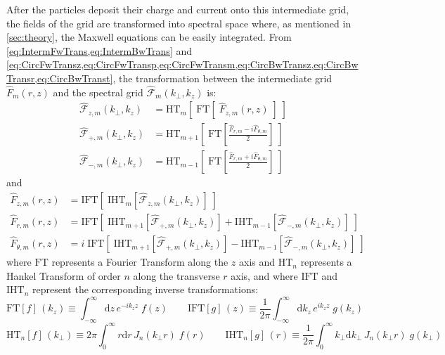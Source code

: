 \documentclass[1p,times]{elsarticle}
\newcommand{\Integ}[1]{\int_{-\infty}^{\infty} \!\!\!\!\!\!
  \mathrm{d}#1}
\newcommand{\RInteg}[1]{\int_{0}^{\infty} \!\!\!\!\! #1\mathrm{d}#1}
\newcommand{\spectral}[1]{\hat{\mathcal{#1}}}
\begin{document}
After the particles deposit their charge and current onto this
intermediate grid, the fields of the grid are transformed into spectral
space where, as mentioned in \cref{sec:theory}, the Maxwell equations 
can be easily integrated. From \cref{eq:IntermFwTrans,eq:IntermBwTrans} and
\cref{eq:CircFwTransz,eq:CircFwTransp,eq:CircFwTransm,eq:CircBwTransz,eq:CircBwTransr,eq:CircBwTranst}, 
the transformation between the intermediate grid $\hat{F}_{m}(r,z)$
and the spectral grid $\spectral{F}_m(k_\perp, k_z)$ is:
\begin{subequations}
\begin{align}
\spectral{F}_{z,m}(k_\perp,k_z) & = \mathrm{HT}_{m} [ \; \mathrm{FT}
                               [ \; \hat{F}_{z,m}(r,z) \; ] \;] \\
\spectral{F}_{+,m}(k_\perp,k_z) &= \mathrm{HT}_{m+1}\left[ \; \mathrm{FT} \left[ \frac{
  \hat{F}_{r,m} -i  \hat{F}_{\theta,m} }{2}  \right] \;\right] \\
\spectral{F}_{-,m}(k_\perp,k_z) &= \mathrm{HT}_{m-1} \left[ \;\mathrm{FT} \left[ \frac{
  \hat{F}_{r,m} +i  \hat{F}_{\theta,m} }{2}  \right] \;\right] 
\end{align}
\end{subequations}
and
\begin{subequations}
\begin{align}
\hat{F}_{z,m}(r,z) &= \mathrm{IFT} [\; \mathrm{IHT}_{m} [
                         \spectral{F}_{z,m}(k_\perp,k_z) ] \; ] \\
\hat{F}_{r,m}(r,z) & = \mathrm{IFT} \left[ \; \mathrm{IHT}_{m+1}
                         [ \spectral{F}_{+,m}(k_\perp,k_z) ] + \mathrm{IHT}_{m-1} [
                         \spectral{F}_{-,m}(k_\perp,k_z) ] \; \right] \label{eq:FTHTr}\\
\hat{F}_{\theta,m}(r,z) & = i\;\mathrm{IFT} \left[ \; \mathrm{IHT}_{m+1}
                         [ \spectral{F}_{+,m}(k_\perp,k_z) ] -
                          \mathrm{IHT}_{m-1} [
                          \spectral{F}_{-,m}(k_\perp,k_z) ] \; \right]
\label{eq:FTHTt}
\end{align}
\end{subequations}
where $\mathrm{FT}$ represents a Fourier Transform along the $z$
axis and $\mathrm{HT}_{n}$ represents a Hankel Transform of order
$n$ along the transverse $r$ axis, and where $\mathrm{IFT}$ and
$\mathrm{IHT}_{n}$ represent the corresponding inverse
transformations:
\begin{equation} 
\mathrm{FT} [f]\, (k_z) \equiv \Integ{z} \, e^{-ik_zz} \; f(z) \qquad 
\mathrm{IFT} [g] \,(z)\equiv \frac{1}{2\pi}\Integ{k_z} \, e^{ik_zz} \;
g(k_z)
\end{equation}
\begin{equation}
\label{eq:def-Hankel} 
\mathrm{HT}_{n} [f]\,(k_\perp) \equiv 2\pi \RInteg{r} \,
J_{n}(k_\perp r) \; f(r) \qquad 
\mathrm{IHT}_{n} [g]\,(r) \equiv \frac{1}{2\pi}\RInteg{k_\perp} \,
J_{n}(k_\perp r)  \;  g(k_\perp) 
\end{equation}
\end{document}
